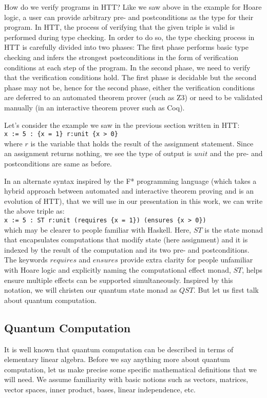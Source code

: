 \documentclass[adraft,creativecommons]{eptcs}
\theoremstyle{definition}
\theoremstyle{remark}
\begin{document}
How do we verify programs in HTT? Like we saw above in the example for Hoare logic, a user can provide arbitrary pre- and postconditions as the type for their program. In HTT, the process of verifying that the given triple is valid is performed during type checking. In order to do so, the type checking process in HTT is carefully divided into two phases: The first phase performs basic type checking and infers the strongest postconditions in the form of verification conditions at each step of the program. In the second phase, we need to verify that the verification conditions hold. The first phase is decidable but the second phase may not be, hence for the second phase, either the verification conditions are deferred to an automated theorem prover (such as Z3) or need to be validated manually (in an interactive theorem prover such as Coq).

Let's consider the example we saw in the previous section written in HTT:\medskip\\
\lstinline[language=QHaskell]!x := 5 : {x = 1} r:unit {x > 0}!
\medskip\\where $r$ is the variable that holds the result of the assignment statement. Since an assignment returns nothing, we see the type of output is $unit$ and the pre- and postconditions are same as before.

In an alternate syntax inspired by the F* programming language (which takes a hybrid approach between automated and interactive theorem proving and is an evolution of HTT), that we will use in our presentation in this work, we can write the above triple as:\medskip\\
\lstinline[language=QHaskell]!x := 5 : ST r:unit (requires {x = 1}) (ensures {x > 0})!
\medskip\\which may be clearer to people familiar with Haskell. Here, $ST$ is the state monad that encapsulates computations that modify state (here assignment) and it is indexed by the result of the computation and its two pre- and postconditions. The keywords $requires$ and $ensures$ provide extra clarity for people unfamiliar with Hoare logic and explicitly naming the computational effect monad, $ST$, helps ensure multiple effects can be supported simultaneously. Inspired by this notation, we will christen our quantum state monad as $QST$. But let us first talk about quantum computation.

\subsection{Quantum Computation}
It is well known that quantum computation can be described in terms of elementary linear algebra. Before we say anything more about quantum computation, let us make precise some specific mathematical definitions that we will need. We assume familiarity with basic notions such as vectors, matrices, vector spaces, inner product, bases, linear independence, etc.
\end{document}
